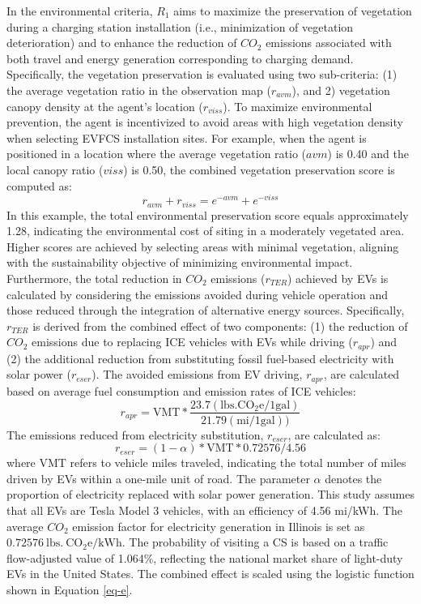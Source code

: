 \documentclass[preprint,12pt]{elsarticle}
\begin{document}
In the environmental criteria, $R_1$ aims to maximize the preservation of vegetation during a charging station installation (i.e., minimization of vegetation deterioration) and to enhance the reduction of $CO_2$ emissions associated with both travel and energy generation corresponding to charging demand. Specifically, the vegetation preservation is evaluated using two sub-criteria: (1) the average vegetation ratio in the observation map ($r_{avm}$), and 2) vegetation canopy density at the agent's location ($r_{viss}$). To maximize environmental prevention, the agent is incentivized to avoid areas with high vegetation density when selecting EVFCS installation sites. For example, when the agent is positioned in a location where the average vegetation ratio ($avm$) is 0.40 and the local canopy ratio ($viss$) is 0.50, the combined vegetation preservation score is computed as:
\begin{equation} \label{eq-b}
    r_{avm}+r_{viss}=e^{-avm} + e^{-viss}
\end{equation}
In this example, the total environmental preservation score equals approximately 1.28, indicating the environmental cost of siting in a moderately vegetated area. Higher scores are achieved by selecting areas with minimal vegetation, aligning with the sustainability objective of minimizing environmental impact. Furthermore, the total reduction in $CO_2$ emissions ($r_{TER}$) achieved by EVs is calculated by considering the emissions avoided during vehicle operation and those reduced through the integration of alternative energy sources. Specifically, $r_{TER}$ is derived from the combined effect of two components: (1) the reduction of $CO_2$ emissions due to replacing ICE vehicles with EVs while driving ($r_{apr}$) and (2) the additional reduction from substituting fossil fuel-based electricity with solar power ($r_{eser}$). The avoided emissions from EV driving, $r_{apr}$, are calculated based on average fuel consumption and emission rates of ICE vehicles:
\begin{equation} \label{eq-c}
    r_{apr}=\mathrm{VMT} * \frac{23.7 (\mathrm{lbs.CO_2e/1gal})}{21.79 (\mathrm{mi/1gal}))}
\end{equation}
The emissions reduced from electricity substitution, $r_{eser}$, are calculated as:
\begin{equation} \label{eq-d}
    r_{eser}=(1-\alpha)*\mathrm{VMT} * 0.72576 / 4.56
\end{equation}
where $\mathrm{VMT}$ refers to vehicle miles traveled, indicating the total number of miles driven by EVs within a one-mile unit of road. The parameter $\alpha$ denotes the proportion of electricity replaced with solar power generation. This study assumes that all EVs are Tesla Model 3 vehicles, with an efficiency of 4.56 mi/kWh. The average $CO_2$ emission factor for electricity generation in Illinois is set as $0.72576 \: \mathrm{lbs. \: CO_2e/kWh}$. The probability of visiting a CS is based on a traffic flow-adjusted value of 1.064\%, reflecting the national market share of light-duty EVs in the United States. The combined effect is scaled using the logistic function shown in Equation \eqref{eq-e}.
\end{document}
